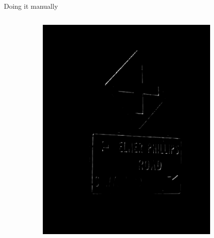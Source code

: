 \documentclass{beamer}
\begin{document}
\begin{frame}{Doing it manually}
\begin{columns}
\begin{column}{0.85\textwidth}
\begin{figure}
\begin{subfigure}[b]{0.22\textwidth}
          \includegraphics[width=\textwidth]{figures/manual_filters/edge_res_3.png}
      \end{subfigure}
      \begin{subfigure}[b]{0.22\textwidth}

\end{subfigure}
\end{figure}
\end{column}
\end{columns}
\end{frame}
\end{document}
